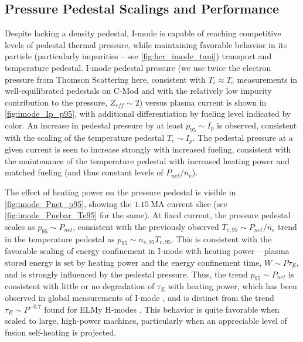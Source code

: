 \subsection{Pressure Pedestal Scalings and Performance}\label{subsec:imode_pres}

Despite lacking a density pedestal, I-mode is capable of reaching competitive levels of pedestal thermal pressure, while maintaining favorable behavior  in its particle (particularly impurities -- see \cref{fig:hcr_imode_taui}) transport and temperature pedestal.  I-mode pedestal pressure (we use twice the electron pressure from Thomson Scattering here, consistent with $T_i \approx T_e$ measurements in well-equilibrated pedestals on C-Mod \cite{Hubbard2011} and with the relatively low impurity contribution to the pressure, $Z_{eff} \sim 2$) versus plasma current is shown in \cref{fig:imode_Ip_p95}, with additional differentiation by fueling level indicated by color.  An increase in pedestal pressure by at least $p_{95} \sim I_p$ is observed, consistent with the scaling of the temperature pedestal $T_e \sim I_p$.  The pedestal pressure at a given current is seen to increase strongly with increased fueling, consistent with the maintenance of the temperature pedestal with increased heating power and matched fueling (and thus constant levels of $P_{net}/\overline{n}_e$).

The effect of heating power on the pressure pedestal is visible in \cref{fig:imode_Pnet_p95}, showing the $\SI{1.15}{\mega\ampere}$ current slice (see \cref{fig:imode_Pnebar_Te95} for the same).  At fixed current, the pressure pedestal scales as $p_{95} \sim P_{net}$, consistent with the previously observed $T_{e,95} \sim P_{net}/\overline{n}_e$ trend in the temperature pedestal as $p_{95} \sim n_{e,95} T_{e,95}$.  This is consistent with the favorable scaling of energy confinement in I-mode with heating power -- plasma stored energy is set by heating power and the energy confinement time, $W \sim P \tau_E$, and is strongly influenced by the pedestal pressure.  Thus, the trend $p_{95} \sim P_{net}$ is consistent with little or no degradation of $\tau_E$ with heating power, which has been observed in global measurements of I-mode \cite{Dominguez2012,Whyte2010}, and is distinct from the trend $\tau_E \sim P^{-0.7}$ found for ELMy H-modes \cite{ITER1999}.  This behavior is quite favorable when scaled to large, high-power machines, particularly when an appreciable level of fusion self-heating is projected.

